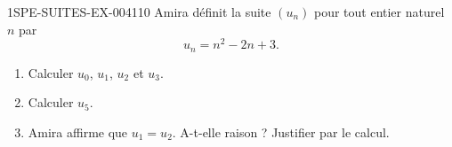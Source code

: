 \begin{exercice}{1SPE-SUITES-EX-004}{1}{10}
Amira définit la suite $(u_n)$ pour tout entier naturel $n$ par
\[
  u_n = n^2 - 2n + 3.
\]
\begin{enumerate}
  \item Calculer $u_0$, $u_1$, $u_2$ et $u_3$.
  \item Calculer $u_5$.
  \item Amira affirme que $u_1 = u_2$. A-t-elle raison ? Justifier par le calcul.
\end{enumerate}
\end{exercice}
